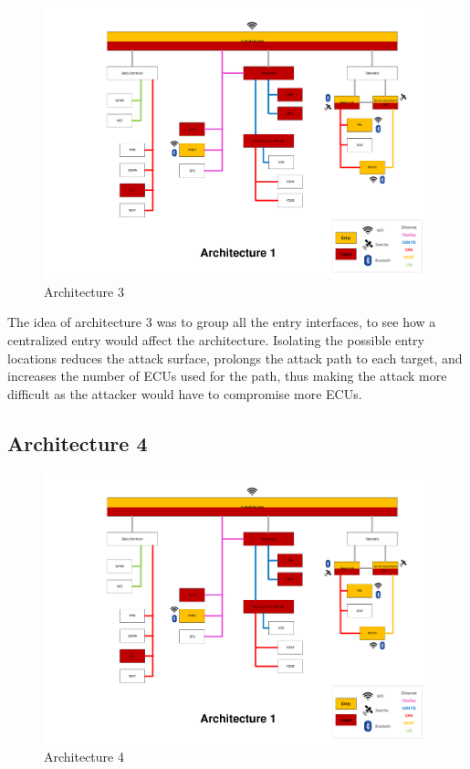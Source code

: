 \begin{figure}[h!]
    \caption{Architecture 3}
    \includegraphics[width=\textwidth, page=3]{../Architectures-survey.pdf}
\end{figure}

The idea of architecture 3 was to group all the entry interfaces, to see how a centralized entry would affect the architecture.
Isolating the possible entry locations reduces the attack surface, prolongs the attack path to each target, and increases the number of ECUs used for the path, thus making the attack more difficult as the attacker would have to compromise more ECUs.\par


\subsection*{Architecture 4}
\label{sec:arch4}

\begin{figure}[h!]
    \caption{Architecture 4}
    \includegraphics[width=\textwidth, page=4]{../Architectures-survey.pdf}
\end{figure}

